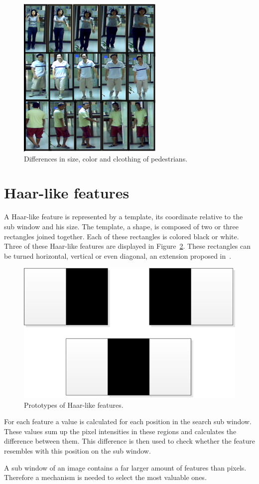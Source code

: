 \documentclass{article}
\begin{document}
\begin{figure}
	\centering
	\includegraphics[scale=0.5]{People.png}
	\caption{Differences in size, color and clcothing of pedestrians.}
	\label{fig:people}
\end{figure}
\section{Haar-like features}
A Haar-like feature is represented by a template, its coordinate relative to the sub window and his size.
The template, a shape, is composed of two or three rectangles joined together. Each of these rectangles is colored black or white. Three of these Haar-like features are displayed in Figure~\ref{fig:features}. These rectangles can be turned horizontal, vertical or even  diagonal, an extension proposed in~\cite{lienhart2002extended}.
\begin{figure}[h!]
	\centering
	\includegraphics[scale=0.6]{Features.png}
	\caption{Prototypes of Haar-like features.}
	\label{fig:features}
\end{figure}
\par
For each feature a value is calculated for each position in the search sub window. These values sum up the pixel intensities in these regions and calculates the difference between them. This difference is then used to check whether the feature resembles with this position on the sub window.
\par
A sub window of an image contains a far larger amount of features than pixels. Therefore a mechanism is needed to select the most valuable ones.
\end{document}
